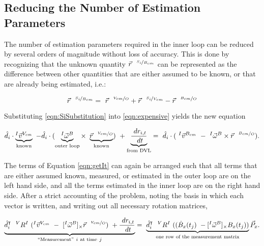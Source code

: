 \subsection{Reducing the Number of Estimation Parameters}


The number of estimation parameters required in the inner loop can be reduced by several orders of magnitude without loss of accuracy. This is done by recognizing that the unknown quantity $\vec{r}^{~~\nicefrac{S_i}{B_{cm}}}$ can be represented as the difference between other quantities that are either assumed to be known, or that are already being estimated, i.e.:

\begin{equation}
    \label{eqn:SiSubstitution}
    \vec{r}^{~~\nicefrac{S_i}{B_{cm}}}  = ~\vec{r}^{~~\nicefrac{V_{cm}}{O}} + \vec{r}^{~~\nicefrac{S_i}{V_{cm}}} - \vec{r}^{~~\nicefrac{B_{cm}}{O}}
\end{equation}

Substituting \ref{eqn:SiSubstitution} into \ref{eqn:expensive} yields the new equation

     \begin{equation}
 \hat{d}_i\cdot\underbrace{^{I}\vec{v}^{V_{cm}}}_\text{known} ~-
  \hat{d}_i\cdot(\underbrace{^{I}\vec{\omega}^{B}}_{\text{outer loop}}\times~\underbrace{\vec{r}^{~~\nicefrac{V_{cm}}{O}}}_\text{known}) ~+
 \underbrace{ \frac{~dr_{i,t}}{~dt}}_{\text{from DVL}}  
  =~\hat{d}_i\cdot(~^{I}\vec{v}^{B_{cm}} ~-
 ~^{I}\vec{\omega}^{B}\times\vec{r}^{~~\nicefrac{B_{cm}}{O}}).
 \label{eqn:getIt}
\end{equation}

The terms of Equation \ref{eqn:getIt} can again be arranged such that all terms that are either assumed known, measured, or estimated in the outer loop are on the left hand side, and all the terms estimated in the inner loop are on the right hand side. After a strict accounting of the problem, noting the basis in which each vector is written, and writing out all necessary rotation matrices,

\begin{equation}
 \underbrace{\hat{d}_i^{\intercal}~~^{V}R^I ~(^{I}\vec{v}^{V_{cm}} ~-~[^{I}\vec{\omega}^{B}]_\times\vec{r}^{~~\nicefrac{V_{cm}}{O}}) ~+
 \frac{~dr_{i,t}}{~dt} }_{``\text{Measurement}" ~i ~\text{at time}~ j}
  =~\underbrace{\hat{d}_i^{\intercal}~~{^{V}R^I} ~((\dot{B}_x(t_j)~-
 [^{I}\vec{\omega}^{B}]_\times B_x(t_j))}_\text{one row of the measurement matrix}\vec{P}_x.
 \label{eqn:finaldvl}
\end{equation}


